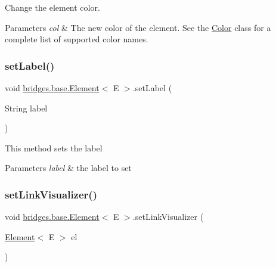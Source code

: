 Change the element color. 


\begin{DoxyParams}{Parameters}
{\em col} & The new color of the element. See the \hyperlink{classbridges_1_1base_1_1_color}{Color} class for a complete list of supported color names. \\
\hline
\end{DoxyParams}
\mbox{\label{classbridges_1_1base_1_1_element_a942ccd766aeca0c4fdbe27ef8cbe78d9}} 
\subsubsection{\texorpdfstring{set\+Label()}{setLabel()}}
{\footnotesize\ttfamily void \hyperlink{classbridges_1_1base_1_1_element}{bridges.\+base.\+Element}$<$ E $>$.set\+Label (\begin{DoxyParamCaption}\item[{String}]{label }\end{DoxyParamCaption})}

This method sets the label


\begin{DoxyParams}{Parameters}
{\em label} & the label to set \\
\hline
\end{DoxyParams}
\mbox{\label{classbridges_1_1base_1_1_element_af6251f52b9d277dd77e3bab1829d0197}} 
\subsubsection{\texorpdfstring{set\+Link\+Visualizer()}{setLinkVisualizer()}}
{\footnotesize\ttfamily void \hyperlink{classbridges_1_1base_1_1_element}{bridges.\+base.\+Element}$<$ E $>$.set\+Link\+Visualizer (\begin{DoxyParamCaption}\item[{\hyperlink{classbridges_1_1base_1_1_element}{Element}$<$ E $>$}]{el }\end{DoxyParamCaption})\hspace{0.3cm}{\ttfamily [protected]}}



